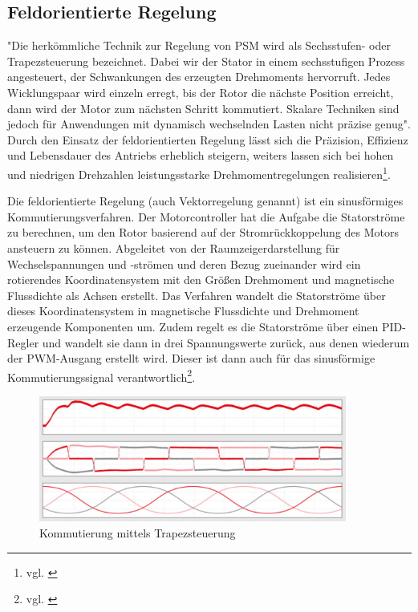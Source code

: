 \newpage
 
\subsection{Feldorientierte Regelung}
"Die herkömmliche Technik zur Regelung von PSM wird als Sechsstufen- oder Trapezsteuerung bezeichnet. Dabei wir der Stator in einem sechsstufigen Prozess angesteuert, der Schwankungen des erzeugten Drehmoments hervorruft. Jedes Wicklungspaar wird einzeln erregt, bis der Rotor die nächste Position erreicht, dann wird der Motor zum nächsten Schritt kommutiert. Skalare Techniken sind jedoch für Anwendungen mit dynamisch wechselnden Lasten nicht präzise genug". Durch den Einsatz der feldorientierten Regelung lässt sich die Präzision, Effizienz und Lebensdauer des Antriebs erheblich steigern, weiters lassen sich bei hohen und niedrigen Drehzahlen leistungsstarke Drehmomentregelungen realisieren\footnote{vgl. \cite{Feldorientierte-Regelung}}.

Die feldorientierte Regelung (auch Vektorregelung genannt) ist ein sinusförmiges Kommutierungsverfahren. Der Motorcontroller hat die Aufgabe die Statorströme zu berechnen, um den Rotor basierend auf der Stromrückkoppelung des Motors ansteuern zu können. Abgeleitet von der Raumzeigerdarstellung für Wechselspannungen und -strömen und deren Bezug zueinander wird ein rotierendes Koordinatensystem mit den Größen Drehmoment und magnetische Flussdichte als Achsen erstellt. Das Verfahren wandelt die Statorströme über dieses Koordinatensystem in magnetische Flussdichte und Drehmoment erzeugende Komponenten um. Zudem regelt es die Statorströme über einen PID-Regler und wandelt sie dann in drei Spannungswerte zurück, aus denen wiederum der PWM-Ausgang erstellt wird. Dieser ist dann auch für das sinusförmige Kommutierungssignal verantwortlich\footnote{vgl. \cite{Feldorientierte-Antriebssteuerung}}.
\\[7mm]
\begin{figure}[H]
	\begin{center}
		\includegraphics[width=0.9\textwidth]{figures/antrieb/Kommutierung_Trapezsteuerung.png}
		\caption{Kommutierung mittels Trapezsteuerung \cite{Feldorientierte-Antriebssteuerung}}
	\end{center}
\end{figure}

